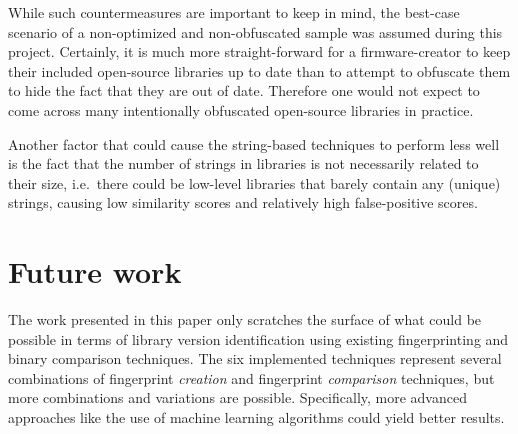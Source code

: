 \documentclass[twocolumn,a4paper]{IEEEtran} %
\begin{document}
While such countermeasures are important to keep in mind, the best-case scenario of a non-optimized and non-obfuscated sample was assumed during this project. Certainly, it is much more straight-forward for a firmware-creator to keep their included open-source libraries up to date than to attempt to obfuscate them to hide the fact that they are out of date. Therefore one would not expect to come across many intentionally obfuscated open-source libraries in practice.


Another factor that could cause the string-based techniques to perform less well is the fact that the number of strings in libraries is not necessarily related to their size, i.e.~there could be low-level libraries that barely contain any (unique) strings, causing low similarity scores and relatively high false-positive scores.



\section{Future work}

The work presented in this paper only scratches the surface of what could be possible in terms of library version identification using existing fingerprinting and binary comparison techniques. The six implemented techniques represent several combinations of fingerprint \emph{creation} and fingerprint \emph{comparison} techniques, but more combinations and variations are possible. Specifically, more advanced approaches like the use of machine learning algorithms \cite{Tian2009} could yield better results.
\end{document}
